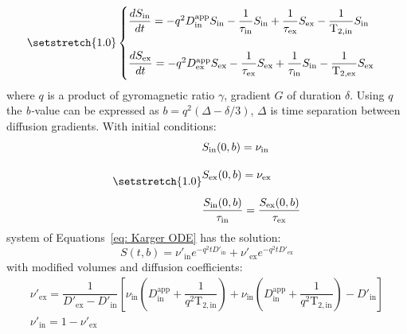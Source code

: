 \begin{equation}\label{eq: Karger ODE}
{\setstretch{1.0}
\begin{cases}
\dfrac{dS_{\mathrm{in}}}{dt}=-q^2D^{\mathrm{app}}_{\mathrm{in}}S_{\mathrm{in}}-\dfrac{1}{\tau_{\mathrm{in}}}S_{\mathrm{in}}+\dfrac{1}{\tau_{\mathrm{ex}}}S_{\mathrm{ex}}-\dfrac{1}{\mathrm{T}_{2,\mathrm{in}}}S_{\mathrm{in}}\\[20pt]
\dfrac{dS_{\mathrm{ex}}}{dt}=-q^2D^{\mathrm{app}}_{\mathrm{ex}}S_{\mathrm{ex}}-\dfrac{1}{\tau_{\mathrm{ex}}}S_{\mathrm{ex}}+\dfrac{1}{\tau_{\mathrm{in}}}S_{\mathrm{in}}-\dfrac{1}{\mathrm{T}_{2,\mathrm{ex}}}S_{\mathrm{ex}}
\end{cases}
}
\end{equation}
where $q$ is a product of gyromagnetic ratio $\gamma$, gradient $G$ of duration $\delta$. 
Using $q$ the \mbox{\textit{b-}value} can be expressed as $b=q^2(\Delta-\delta/3)$, $\Delta$ is time separation between diffusion gradients. 
With initial conditions:
\begin{equation}\label{eq: Karger IC}
{\setstretch{1.0}
\begin{aligned}
& S_{\mathrm{in}}(0,b)=\nu_{\mathrm{in}}\\[10pt]
& S_{\mathrm{ex}}(0,b)=\nu_{\mathrm{ex}}\\[10pt]
& \dfrac{S_{\mathrm{in}}(0,b)}{\tau_{\mathrm{in}}}=\dfrac{S_{\mathrm{ex}}(0,b)}{\tau_{\mathrm{ex}}}
\end{aligned}
}
\end{equation}
system of Equations~\ref{eq: Karger ODE} has the solution:
\begin{equation}\label{eq: Karger Solution}
S(t,b)=\nu'_{\mathrm{in}} e^{-q^2tD'_{\mathrm{in}}}+\nu'_{\mathrm{ex}} e^{-q^2tD'_{\mathrm{ex}}}
\end{equation}
with modified volumes and diffusion coefficients:
\begin{equation}\label{eq: Karger v modified}
\begin{array}{l}
\nu'_{\mathrm{ex}} = \dfrac{1}{D'_{\mathrm{ex}}-D'_{\mathrm{in}}} \left[\nu_{\mathrm{in}}\left( D^{\mathrm{app}}_{\mathrm{in}} + \dfrac{1}{q^2 \mathrm{T}_{2,\mathrm{in}}} \right) + \nu_{\mathrm{in}}\left( D^{\mathrm{app}}_{\mathrm{in}} + \dfrac{1}{q^2 \mathrm{T}_{2,\mathrm{in}}} \right) - D'_{\mathrm{in}} \right]\\[10pt]
\nu'_{\mathrm{in}} = 1 - \nu'_{\mathrm{ex}}
\end{array}
\end{equation}
